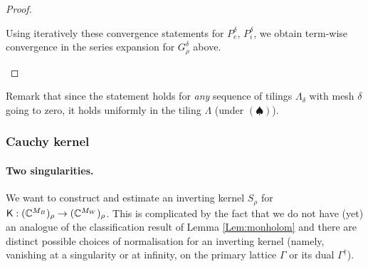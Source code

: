 \documentclass[10pt]{article}
\newcommand{\C}{\mathbb{C}}
\newcommand{\rK}{{\sf K}}
\newcommand{\dg}{\dagger}
\begin{document}
\begin{proof}
\begin{enumerate}
Using iteratively these convergence statements for $P_e^\delta$, $P_i^\delta$, we obtain term-wise convergence in the series expansion for $G^\delta_\rho$ above. 
\end{enumerate}
\end{proof}

Remark that since the statement holds for {\em any} sequence of tilings $\Lambda_\delta$ with mesh $\delta$ going to zero, it holds uniformly in the tiling $\Lambda$ (under $(\spadesuit)$).


\subsubsection{Cauchy kernel}\label{sss:moninv}

\paragraph{Two singularities.\\}

We want to construct and estimate an inverting kernel $S_\rho$ for $\rK:(\C^{M_B})_\rho\rightarrow(\C^{M_W})_\rho$. This is complicated by the fact that we do not have (yet) an analogue of the classification result of Lemma \ref{Lem:monholom} and there are distinct possible choices of normalisation for an inverting kernel (namely, vanishing at a singularity or at infinity, on the primary lattice $\Gamma$ or its dual $\Gamma^\dg$).
\end{document}
